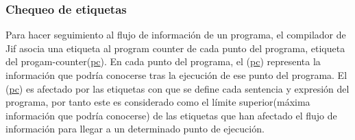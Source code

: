 \subsubsection{Chequeo de etiquetas}
Para hacer seguimiento al flujo de información de un programa, el compilador de
Jif asocia una etiqueta al program counter de cada punto del programa,
etiqueta del progam-counter(\underline{pc}). En cada punto del programa, el
(\underline{pc}) representa la información que podría conocerse tras la
ejecución de ese punto del programa.
El (\underline{pc}) es afectado por las etiquetas con que se define cada
sentencia y expresión del programa, por tanto este es considerado como el límite
superior(máxima información que podría conocerse) de las etiquetas que han
afectado el flujo de información para llegar a un determinado punto de ejecución.

